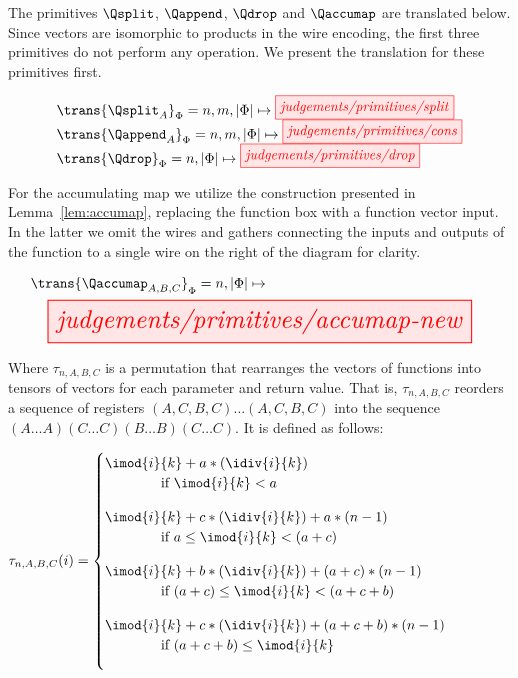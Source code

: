 The primitives $\Qsplit$, $\Qappend$, $\Qdrop$ and $\Qaccumap$ are translated below. Since vectors are isomorphic to products in the wire encoding, the first three primitives do not perform any operation. We present the translation for these primitives first.

\[
\begin{array}{l}
    \trans{\Qsplit_A}_\Phi = n, m, |\Phi| \mapsto \tikzfig{judgements/primitives/split} \\
    \trans{\Qappend_A}_\Phi = n, m, |\Phi| \mapsto \tikzfig{judgements/primitives/cons} \\
    \trans{\Qdrop}_\Phi = n,|\Phi| \mapsto \tikzfig{judgements/primitives/drop}
\end{array}
\]

For the accumulating map we utilize the construction presented in Lemma~\ref{lem:accumap}, replacing the function box with a function vector input. In the latter we omit the wires and gathers connecting the inputs and outputs of the function to a single wire on the right of the diagram for clarity.

\[
\begin{array}{l}
    \trans{\Qaccumap_{A,B,C}}_\Phi = n, |\Phi| \mapsto \\[5pt]
    \resizebox{0.95\textwidth}{!}{\tikzfig{judgements/primitives/accumap-new}}
\end{array}
\]

Where $\tau_{n,A,B,C}$ is a permutation that rearranges the vectors of functions into tensors of vectors for each parameter and return value. That is, $\tau_{n,A,B,C}$ reorders a sequence of registers $(A,C,B,C)\dots(A,C,B,C)$ into the sequence $(A\dots A)(C\dots C)(B\dots B)(C\dots C)$. It is defined as follows:

\noindent
\(
    \tau_{n,A,B,C}(i) = \begin{cases}
        \imod{i}{k} + a * (\idiv{i}{k})\\
            \qquad\qquad\text{if } \imod{i}{k} < a \\[10pt]
        \imod{i}{k} + c * (\idiv{i}{k}) + a*(n-1)\\
            \qquad\qquad\text{if } a \leq \imod{i}{k} < (a+c) \\[10pt]
        \imod{i}{k} + b * (\idiv{i}{k}) + (a+c)*(n-1)\\
            \qquad\qquad\text{if } (a+c) \leq \imod{i}{k} < (a+c+b)\\[10pt]
        \imod{i}{k} + c * (\idiv{i}{k}) + (a+c+b)*(n-1)\\
            \qquad\qquad\text{if } (a+c+b) \leq \imod{i}{k}\\[10pt]
    \end{cases}
\)


